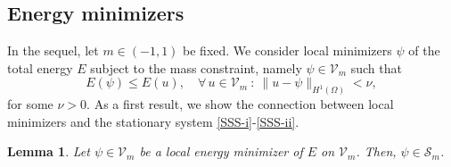 \documentclass[11pt,reqno]{amsart}
\newtheorem{lemma}[theorem]{Lemma}
\theoremstyle{remark}
\numberwithin{equation}{section}
\begin{document}
\subsection{Energy minimizers}
In the sequel, let $m\in (-1,1)$ be fixed. We consider local minimizers $\psi$ of the total energy $E$ subject to the mass constraint, namely 
$\psi\in \mathcal{V}_m$ such that
$$
E(\psi) \leq E(u), \quad \forall \, u\in \mathcal{V}_m\ : \ \|u-\psi\|_{H^1(\Omega)}<\nu,
$$
for some $\nu>0$. 
As a first result, we show the connection between local minimizers and the stationary system  \eqref{SSS-i}-\eqref{SSS-ii}.
\begin{lemma}
\label{chmini}
Let $\psi\in \mathcal{V}_m$ be a local energy minimizer of $E$ on $\mathcal{V}_m$. Then, $\psi \in \mathcal{S}_m$. 
\end{lemma}
%
\end{document}
